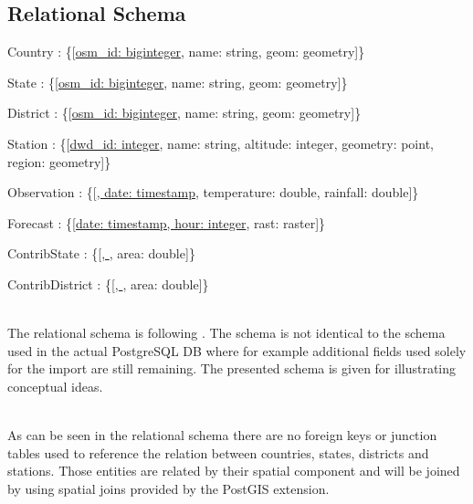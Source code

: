 \documentclass[paper=a4, fontsize=11pt]{article} %
\numberwithin{equation}{section} %
\numberwithin{figure}{section} %
\numberwithin{table}{section} %
\begin{document}
\subsection{Relational Schema}

  Country : \{{[}\uline{osm\_id: biginteger}, name: string, geom:  geometry{]}\}

  State : \{{[}\uline{osm\_id: biginteger}, name: string, geom: geometry{]}\}

  District : \{{[}\uline{osm\_id: biginteger}, name: string, geom: geometry{]}\}

  Station : \{{[}\uline{dwd\_id: integer}, name: string, altitude: integer, geometry: point, region: geometry{]}\}

  Observation : \{{[}\uline{, date: timestamp}, temperature: double, rainfall: double{]}\}

  Forecast : \{{[}\uline{date: timestamp, hour: integer}, rast: raster{]}\}

  ContribState : \{{[}\uline{, }, area: double{]}\}

  ContribDistrict : \{{[}\uline{, }, area: double{]}\}

  ~\\
  The relational schema is following \cite{Kemper2011}. The schema is not identical to the schema used in the actual PostgreSQL DB where for example additional fields used solely for the import are still remaining. The presented schema is given for illustrating conceptual ideas.

  ~\\
  As can be seen in the relational schema there are no foreign keys or junction tables
  used to reference the relation between countries, states, districts and stations.
  Those entities are related by their spatial component and will be joined by using
  spatial joins provided by the PostGIS extension.
\end{document}
